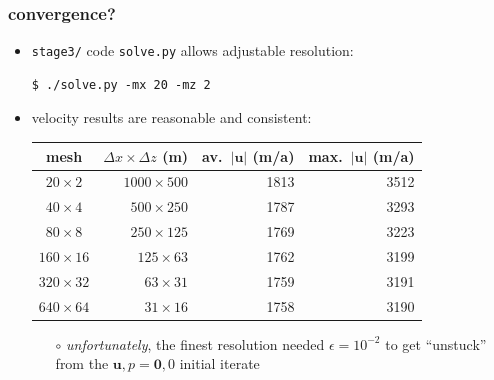 \documentclass[10pt,hyperref,dvipsnames]{beamer}
\newcommand{\bu}{\mathbf{u}}
\newcommand{\eps}{\epsilon}
\begin{document}
\begin{frame}[fragile]
\frametitle{convergence?}

\begin{itemize}
\item \texttt{stage3/} code \texttt{solve.py} allows adjustable resolution:
\begin{Verbatim}
$ ./solve.py -mx 20 -mz 2
\end{Verbatim}
\item velocity results are reasonable and consistent:

\medskip
\begin{center}
\small
\begin{tabular}{c|rrr}
mesh           &   $\Delta x\times \Delta z$ (m) & av.~$|\bu|$ (m/a) & max.~$|\bu|$ (m/a) \\ \hline
$20\times 2$   &  $1000 \times 500$ &        1813 &         3512 \\
$40\times 4$   &   $500 \times 250$ &        1787 &         3293 \\
$80\times 8$   &   $250 \times 125$ &        1769 &         3223 \\
$160\times 16$ &    $125 \times 63$ &        1762 &         3199 \\
$320\times 32$ &     $63 \times 31$ &        1759 &         3191 \\
$640\times 64$ &     $31 \times 16$ &        1758 &         3190
\end{tabular}
\normalsize
\end{center}

    \begin{itemize}
    \item[$\circ$] \emph{unfortunately}, the finest resolution needed $\eps=10^{-2}$ to get ``unstuck'' from the $\bu,p=\mathbf{0},0$ initial iterate
    \end{itemize}
\end{itemize}
\end{frame}
\end{document}
